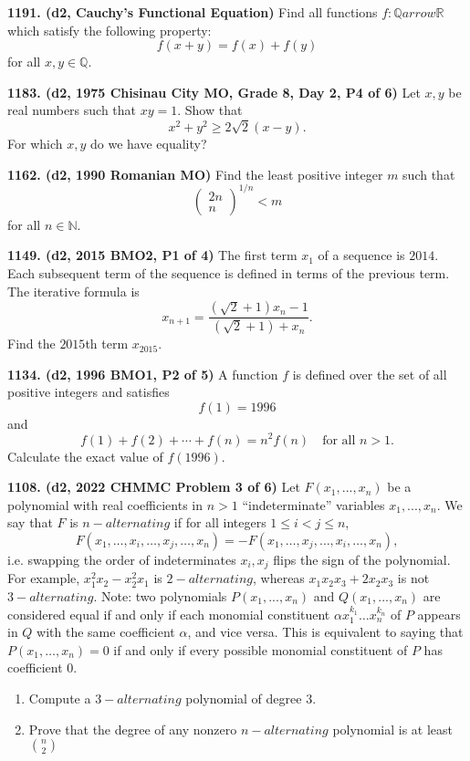 \documentclass{article}
\begin{document}
\textbf{1191. (\color{red}d2\color{black}, Cauchy's Functional Equation)} Find all functions $f:\mathbb Qarrow\mathbb R$ which satisfy the following property: $$f(x+y)=f(x)+f(y)$$ for all $x,y\in\mathbb Q$.

\textbf{1183. (\color{red}d2\color{black}, 1975 Chisinau City MO, Grade 8, Day 2, P4 of 6)} Let $x, y$ be real numbers such that $xy = 1$. Show that \begin{equation*}x^2 + y^2 \ge 2\sqrt{2}(x-y).\end{equation*} For which $x, y$ do we have equality?

\textbf{1162. (\color{red}d2\color{black}, 1990 Romanian MO)} Find the least positive integer $m$ such that \begin{equation*}\begin{pmatrix}2n\\n\end{pmatrix}^{1/n} < m\end{equation*} for all $n \in \mathbb{N}$.

\textbf{1149. (\color{red}d2\color{black}, 2015 BMO2, P1 of 4)} The first term $x_1$ of a sequence is $2014$. Each subsequent term of the sequence is defined in terms of the previous term. The iterative formula is $$x_{n+1}=\frac{(\sqrt2+1)x_n-1}{(\sqrt2+1)+x_n}.$$ Find the $2015$th term $x_{2015}$.

\textbf{1134. (\color{red}d2\color{black}, 1996 BMO1, P2 of 5)} A function $f$ is defined over the set of all positive integers and satisfies \begin{equation*}f(1) = 1996\end{equation*} and \begin{equation*}f(1) + f(2) + \cdots + f(n) = n^2 f(n) \quad \text{for all } n > 1.\end{equation*}Calculate the exact value of $f(1996)$.

\textbf{1108. (\color{red}d2\color{black}, 2022 CHMMC Problem 3 of 6)} Let $F(x_1,..., x_n)$ be a polynomial with real coefficients in $n > 1$ “indeterminate” variables $x_1,..., x_n$. We say that $F$ is $n-alternating$ if for all integers $1 \leq i < j \leq n$,
\[
    F(x_1,\ldots, x_i,\ldots , x_j ,\ldots, x_n) = -F(x_1,\ldots, x_j ,\ldots, x_i ,\ldots, x_n),
\]
i.e. swapping the order of indeterminates $x_i, x_j$ flips the sign of the polynomial. For example, $x^2_1x_2 - x_2^2x_1$ is $2-alternating$, whereas $x_1x_2x_3 +2x_2x_3$ is not $3-alternating$.
Note: two polynomials $P(x_1,..., x_n)$ and $Q(x_1,..., x_n)$ are considered equal if and only if each monomial constituent $\alpha x_1^{k_1} \ldots x_n^{k_n}$  of $P$ appears in $Q$ with the same coefficient $\alpha$, and vice versa. This is equivalent to saying that $P(x_1,\ldots, x_n) = 0$ if and only if every possible monomial constituent of $P$ has coefficient $0$.
\begin{enumerate}
    \item Compute a $3-alternating$ polynomial of degree $3$.
    \item Prove that the degree of any nonzero $n-alternating$ polynomial is at least $\binom{n}{2}$
\end{enumerate}
\end{document}

